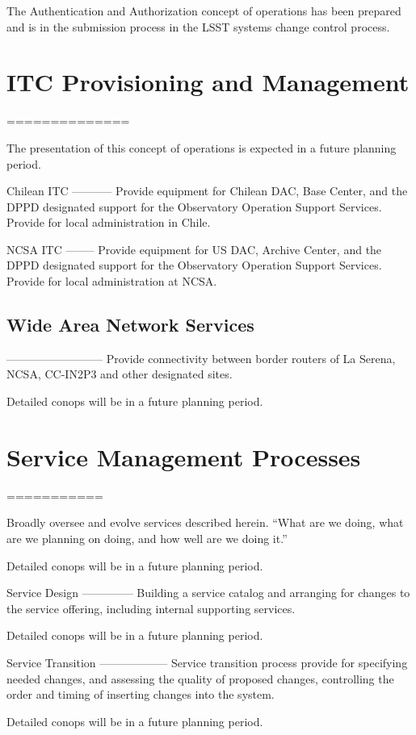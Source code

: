 The Authentication and Authorization concept of operations has been prepared and
is in the submission process in the LSST systems change control process.


\section{ ITC Provisioning and Management}
==============

The presentation of this concept of operations is expected in a future planning period.


Chilean ITC
-----------
Provide equipment for Chilean DAC, Base Center, and the DPPD designated support for the Observatory Operation Support Services. Provide for local administration in Chile.

NCSA ITC
--------
Provide equipment for US DAC, Archive Center, and the DPPD designated support for the Observatory Operation Support Services. Provide for local administration at NCSA.


\subsection{Wide Area Network Services}
--------------------------
Provide connectivity between border routers of La Serena, NCSA, CC-IN2P3 and other designated sites.

Detailed conops will be in a future planning period.


\section{ Service Management Processes}
===========

Broadly oversee and evolve services described herein. “What are we doing, what are we planning on doing, and how well are we doing it.”

Detailed conops will be in a future planning period.


Service Design
--------------
Building a service catalog and arranging for changes to the service offering, including internal supporting services.

Detailed conops will be in a future planning period.


Service Transition
------------------
Service transition process provide for specifying needed changes, and assessing the quality of proposed changes,
controlling the order and timing of inserting changes  into the system.

Detailed conops will be in a future planning period.

